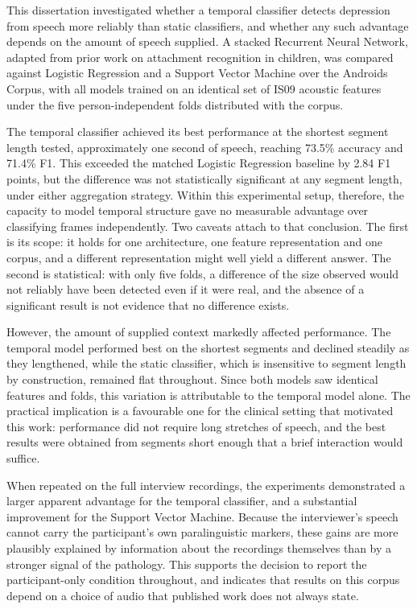 \documentclass{mproj}
\begin{document}
This dissertation investigated whether a temporal classifier detects depression from speech more reliably than static classifiers, and whether any such advantage depends on the amount of speech supplied. A stacked Recurrent Neural Network, adapted from prior work on attachment recognition in children, was compared against Logistic Regression and a Support Vector Machine over the Androids Corpus, with all models trained on an identical set of IS09 acoustic features under the five person-independent folds distributed with the corpus.

The temporal classifier achieved its best performance at the shortest segment length tested, approximately one second of speech, reaching 73.5\% accuracy and 71.4\% F1. This exceeded the matched Logistic Regression baseline by 2.84 F1 points, but the difference was not statistically significant at any segment length, under either aggregation strategy. Within this experimental setup, therefore, the capacity to model temporal structure gave no measurable advantage over classifying frames independently. Two caveats attach to that conclusion. The first is its scope: it holds for one architecture, one feature representation and one corpus, and a different representation might well yield a different answer. The second is statistical: with only five folds, a difference of the size observed would not reliably have been detected even if it were real, and the absence of a significant result is not evidence that no difference exists.

However, the amount of supplied context markedly affected performance. The temporal model performed best on the shortest segments and declined steadily as they lengthened, while the static classifier, which is insensitive to segment length by construction, remained flat throughout. Since both models saw identical features and folds, this variation is attributable to the temporal model alone. The practical implication is a favourable one for the clinical setting that motivated this work: performance did not require long stretches of speech, and the best results were obtained from segments short enough that a brief interaction would suffice.

When repeated on the full interview recordings, the experiments demonstrated a larger apparent advantage for the temporal classifier, and a substantial improvement for the Support Vector Machine. Because the interviewer's speech cannot carry the participant's own paralinguistic markers, these gains are more plausibly explained by information about the recordings themselves than by a stronger signal of the pathology. This supports the decision to report the participant-only condition throughout, and indicates that results on this corpus depend on a choice of audio that published work does not always state.
\end{document}
